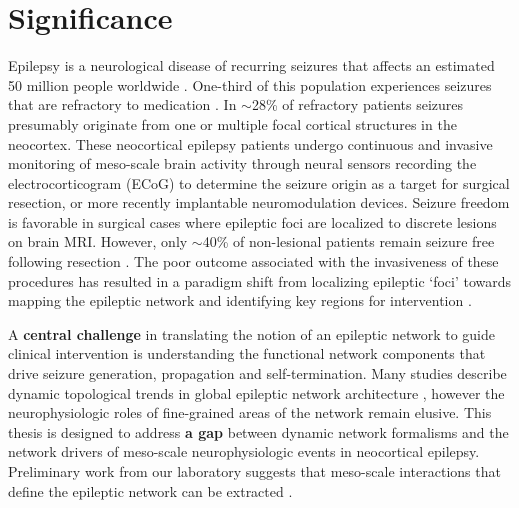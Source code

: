 \section{Significance}
Epilepsy is a neurological disease of recurring seizures that affects an estimated 50 million people worldwide \cite{kwan2000early}. One-third of this population experiences seizures that are refractory to medication \cite{kwan2000early}. In $\sim$28\% of refractory patients seizures presumably originate from one or multiple focal cortical structures in the neocortex. These neocortical epilepsy patients undergo continuous and invasive monitoring of meso-scale brain activity through neural sensors recording the electrocorticogram (ECoG) to determine the seizure origin as a target for surgical resection, or more recently implantable neuromodulation devices. Seizure freedom is favorable in surgical cases where epileptic foci are localized to discrete lesions on brain MRI. However, only $\sim$40\% of non-lesional patients remain seizure free following resection \cite{french2007refractory}. The poor outcome associated with the invasiveness of these procedures has resulted in a paradigm shift from localizing epileptic `foci' towards mapping the epileptic network and identifying key regions for intervention \cite{spencer2002neural, kramer2012epilepsy, lehnertz2014evolving}.

A \textbf{central challenge} in translating the notion of an epileptic network to guide clinical intervention is understanding the functional network components that drive seizure generation, propagation and self-termination. Many studies describe dynamic topological trends in global epileptic network architecture \cite{jerger2005multivariate, schindler2006assessing, schindler2008evolving, kramer2010coalescence, jiruska2012synchronization}, however the neurophysiologic roles of fine-grained areas of the network remain elusive. This thesis is designed to address \textbf{a gap} between dynamic network formalisms and the network drivers of meso-scale neurophysiologic events in neocortical epilepsy. Preliminary work from our laboratory suggests that meso-scale interactions that define the epileptic network can be extracted \cite{khambhati2014dynamic}.


